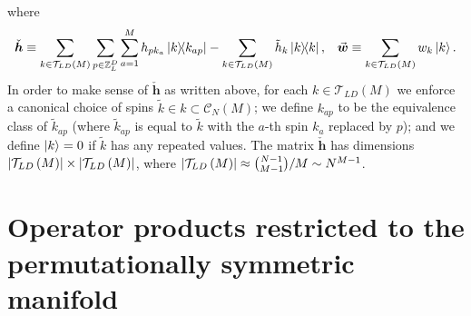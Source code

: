 \documentclass[nofootinbib,notitlepage,11pt]{revtex4-2}
\newcommand{\p}[1]{\left(#1\right)} %
\newcommand{\m}{\bm} %
\renewcommand{\v}{\vec} %
\newcommand{\1}{\mathds{1}}
\newcommand{\C}{\mathcal{C}}
\newcommand{\T}{\mathcal{T}}
\newcommand{\ZZ}{\mathbb{Z}}
\begin{document}
where
\begin{align}
  \check{\m h}
  \equiv \sum_{k\in\T_{LD}\p{M}} \sum_{p\in\ZZ_L^D} \sum_{a=1}^M
  h_{pk_a} \op{k}{k_{ap}}
  - \sum_{k\in\T_{LD}\p{M}} \tilde h_k \op{k},
  &&
  \v{\m w} \equiv \sum_{k\in\T_{LD}\p{M}} w_k \ket{k}.
\end{align}
In order to make sense of $\check{\m h}$ as written above, for each
$k\in\T_{LD}\p{M}$ we enforce a canonical choice of spins
$\tilde k\in k\subset\C_N\p{M}$; we define $k_{ap}$ to be the
equivalence class of $\tilde k_{ap}$ (where $\tilde k_{ap}$ is equal
to $\tilde k$ with the $a$-th spin $k_a$ replaced by $p$); and we
define $\ket{k}=0$ if $\tilde k$ has any repeated values.  The matrix
$\check{\m h}$ has dimensions
$\abs{\T_{LD}\p{M}}\times\abs{\T_{LD}\p{M}}$, where
$\abs{\T_{LD}\p{M}} \approx { N-1 \choose M-1 }/M \sim N^{M-1}$.

\section{Operator products restricted to the permutationally symmetric
  manifold}
\label{sec:sym_prod}
\end{document}
